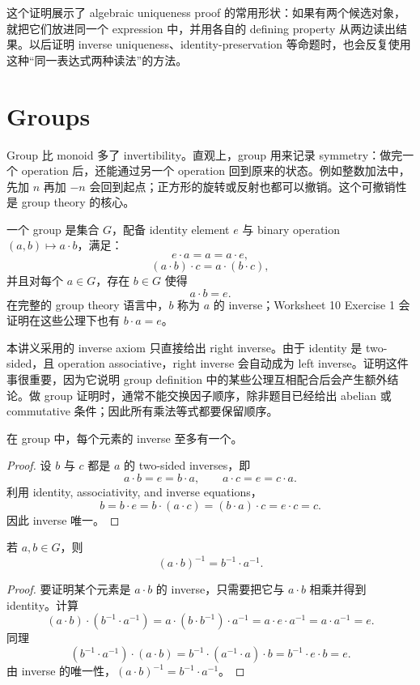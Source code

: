 这个证明展示了 algebraic uniqueness proof 的常用形状：如果有两个候选对象，就把它们放进同一个 expression 中，并用各自的 defining property 从两边读出结果。以后证明 inverse uniqueness、identity-preservation 等命题时，也会反复使用这种“同一表达式两种读法”的方法。

\section{Groups}

Group 比 monoid 多了 invertibility。直观上，group 用来记录 symmetry：做完一个 operation 后，还能通过另一个 operation 回到原来的状态。例如整数加法中，先加 \(n\) 再加 \(-n\) 会回到起点；正方形的旋转或反射也都可以撤销。这个可撤销性是 group theory 的核心。

\begin{definition}[group]
一个 group 是集合 \(G\)，配备 identity element \(e\) 与 binary operation \((a,b)\mapsto a\cdot b\)，满足：
\[
  e\cdot a=a=a\cdot e,
\]
\[
  (a\cdot b)\cdot c=a\cdot(b\cdot c),
\]
并且对每个 \(a\in G\)，存在 \(b\in G\) 使得
\[
  a\cdot b=e.
\]
在完整的 group theory 语言中，\(b\) 称为 \(a\) 的 inverse；Worksheet 10 Exercise 1 会证明在这些公理下也有 \(b\cdot a=e\)。
\end{definition}

本讲义采用的 inverse axiom 只直接给出 right inverse。由于 identity 是 two-sided，且 operation associative，right inverse 会自动成为 left inverse。证明这件事很重要，因为它说明 group definition 中的某些公理互相配合后会产生额外结论。做 group 证明时，通常不能交换因子顺序，除非题目已经给出 abelian 或 commutative 条件；因此所有乘法等式都要保留顺序。

\begin{proposition}
在 group 中，每个元素的 inverse 至多有一个。
\end{proposition}

\begin{proof}
设 \(b\) 与 \(c\) 都是 \(a\) 的 two-sided inverses，即
\[
  a\cdot b=e=b\cdot a,\qquad a\cdot c=e=c\cdot a.
\]
利用 identity, associativity, and inverse equations，
\[
  b=b\cdot e=b\cdot(a\cdot c)=(b\cdot a)\cdot c=e\cdot c=c.
\]
因此 inverse 唯一。
\end{proof}

\begin{proposition}
若 \(a,b\in G\)，则
\[
  (a\cdot b)^{-1}=b^{-1}\cdot a^{-1}.
\]
\end{proposition}

\begin{proof}
要证明某个元素是 \(a\cdot b\) 的 inverse，只需要把它与 \(a\cdot b\) 相乘并得到 identity。计算
\[
  (a\cdot b)\cdot(b^{-1}\cdot a^{-1})
  =a\cdot(b\cdot b^{-1})\cdot a^{-1}
  =a\cdot e\cdot a^{-1}
  =a\cdot a^{-1}
  =e.
\]
同理
\[
  (b^{-1}\cdot a^{-1})\cdot(a\cdot b)
  =b^{-1}\cdot(a^{-1}\cdot a)\cdot b
  =b^{-1}\cdot e\cdot b
  =e.
\]
由 inverse 的唯一性，\((a\cdot b)^{-1}=b^{-1}\cdot a^{-1}\)。
\end{proof}

